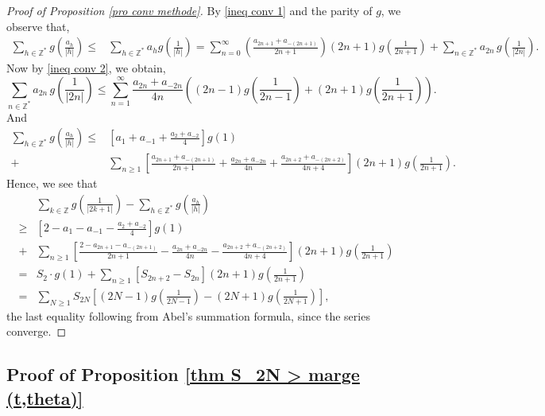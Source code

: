 \documentclass[12pt]{amsart}
\theoremstyle{definition}
\numberwithin{equation}{section}
\numberwithin{equation}{section}
\def\Z{\mathbb{Z}}
\begin{document}
\begin{proof}[Proof of Proposition \ref{pro conv methode}]
By \eqref{ineq conv 1} and the parity of $g$, we observe that,
\begin{align*}
\sum_{h\in\Z^*} g\left(\frac{a_h}{|h|}\right)
\leq &
\sum_{h\in\Z^*} a_h g\left(\frac{1}{|h|}\right)=\sum_{n = 0}^\infty \left(\frac{a_{2n+1}+a_{-(2n+1)}}{2n+1}\right)(2n+1)g\left(\frac{1}{2n+1}\right)+
\sum_{n \in \Z^*} a_{2n} \,g\left(\frac{1}{|2n|}\right).
\end{align*}
Now by \eqref{ineq conv 2}, we obtain,
\[
\sum_{n \in \Z^*} a_{2n}\, g\left(\frac{1}{|2n|}\right)
\leq 
\sum_{n=1}^\infty
\frac{a_{2n}+a_{-2n}}{4n} \left((2n-1)g\left(\frac{1}{2n-1}\right)+ (2n+1)g\left(\frac{1}{2n+1}\right)\right).
\]
And
\begin{align*}
    \sum_{h\in\Z^*} g\left(\frac{a_h}{|h|}\right)
\leq &\left[a_{1}+a_{-1}
+\frac{a_{2}+a_{-2}}{4}\right]g\left(1\right)\\
+&
\sum_{n\geq 1} \left[\frac{a_{2n+1}+a_{-(2n+1)}}{2n+1}
+\frac{a_{2n}+a_{-2n}}{4n} +\frac{a_{2n+2}+a_{-(2n+2)}}{4n+4}
\right](2n+1)g\left(\frac{1}{2n+1}\right).
\end{align*}
Hence, we see that
\begin{align*}
     &
\sum_{k\in\Z} g\left(\frac{1}{|2k+1|}\right)-
\sum_{h\in\Z^*} g\left(\frac{a_h}{|h|}\right)\\
\geq &
\left[2-a_{1}-a_{-1}
-\frac{a_{2}+a_{-2}}{4}\right]g\left(1\right)\\
+&
\sum_{n\geq 1} \left[\frac{2-a_{2n+1}-a_{-(2n+1)}}{2n+1}
-\frac{a_{2n}+a_{-2n}}{4n} -\frac{a_{2n+2}+a_{-(2n+2)}}{4n+4}
\right](2n+1)g\left(\frac{1}{2n+1}\right)\\
=& S_2 \cdot g\left(1\right)+
\sum_{n \geq 1} \left[S_{2n+2}-S_{2n}\right](2n+1)g\left(\frac{1}{2n+1}\right)\\
=&\sum_{N \geq 1} S_{2N} \left[
(2N-1)g\left(\frac{1}{2N-1}\right)
-(2N+1)g\left(\frac{1}{2N+1}\right)\right],
\end{align*}
the last equality following from Abel's summation formula, since the series converge.
\end{proof}



\subsection{Proof of Proposition \ref{thm S_2N > marge (t,theta)}}
\end{document}
